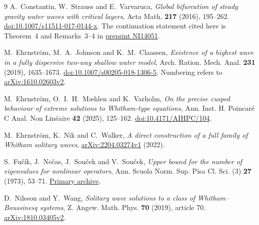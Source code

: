 \documentclass[11pt,a4paper]{article}
\theoremstyle{remark}
\begin{document}
\begin{thebibliography}{9}
A.~Constantin, W.~Strauss and E.~Varvaruca,
\emph{Global bifurcation of steady gravity water waves with critical layers},
Acta Math. \textbf{217} (2016), 195--262.
\href{https://doi.org/10.1007/s11511-017-0144-x}{doi:10.1007/s11511-017-0144-x}.
The continuation statement cited here is Theorem~4 and Remarks~3--4 in
\href{https://api.newton.ac.uk/website/v0/events/preprints/NI14051}{preprint NI14051}.

M.~Ehrnstr\"om, M.~A.~Johnson and K.~M.~Claassen,
\emph{Existence of a highest wave in a fully dispersive two-way shallow
water model}, Arch. Ration. Mech. Anal. \textbf{231} (2019), 1635--1673.
\href{https://doi.org/10.1007/s00205-018-1306-5}{doi:10.1007/s00205-018-1306-5}.
Numbering refers to \href{https://arxiv.org/abs/1610.02603v2}{arXiv:1610.02603v2}.

M.~Ehrnstr\"om, O.~I.~H.~M{\ae}hlen and K.~Varholm,
\emph{On the precise cusped behaviour of extreme solutions to Whitham-type
equations}, Ann. Inst. H. Poincar\'e C Anal. Non Lin\'eaire
\textbf{42} (2025), 125--162.
\href{https://doi.org/10.4171/AIHPC/104}{doi:10.4171/AIHPC/104}.

M.~Ehrnstr\"om, K.~Nik and C.~Walker,
\emph{A direct construction of a full family of Whitham solitary waves},
\href{https://arxiv.org/abs/2204.03274v1}{arXiv:2204.03274v1} (2022).

S.~Fu\v c\'ik, J.~Ne\v cas, J.~Sou\v cek and V.~Sou\v cek,
\emph{Upper bound for the number of eigenvalues for nonlinear operators},
Ann. Scuola Norm. Sup. Pisa Cl. Sci. (3) \textbf{27} (1973), 53--71.
\href{https://www.numdam.org/item/ASNSP_1973_3_27_1_53_0/}{Primary archive}.

D.~Nilsson and Y.~Wang,
\emph{Solitary wave solutions to a class of Whitham--Boussinesq systems},
Z. Angew. Math. Phys. \textbf{70} (2019), article 70.
\href{https://arxiv.org/abs/1810.03405v2}{arXiv:1810.03405v2}.
\end{thebibliography}
\end{document}
